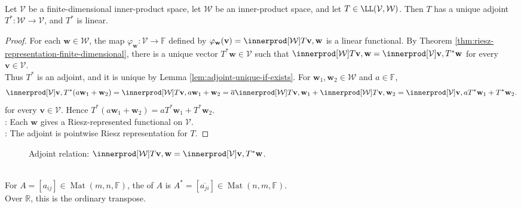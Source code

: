 \begin{theorem} \label{thm:finite-dimensional-adjoint-exists} \\
Let $\mathcal{V}$ be a finite-dimensional inner-product space, let $\mathcal{W}$ be an inner-product space, and let $T\in\LL(\mathcal{V},\mathcal{W})$. Then $T$ has a unique adjoint $T^*:\mathcal{W}\to\mathcal{V}$, and $T^*$ is linear.
\begin{proof}
For each $\mathbf{w}\in\mathcal{W}$, the map $\varphi_{\mathbf{w}}:\mathcal{V}\to\mathbb{F}$ defined by $\varphi_{\mathbf{w}}(\mathbf{v})=\innerprod[\mathcal{W}]{T\mathbf{v},\mathbf{w}}$ is a linear functional. By Theorem \ref{thm:riesz-representation-finite-dimensional}, there is a unique vector $T^*\mathbf{w}\in\mathcal{V}$ such that $\innerprod[\mathcal{W}]{T\mathbf{v},\mathbf{w}} =\innerprod[\mathcal{V}]{\mathbf{v},T^*\mathbf{w}}$ for every $\mathbf{v}\in\mathcal{V}$.\\
Thus $T^*$ is an adjoint, and it is unique by Lemma \ref{lem:adjoint-unique-if-exists}. For $\mathbf{w}_1,\mathbf{w}_2\in\mathcal{W}$ and $a\in\mathbb{F}$,
\begin{align}
\innerprod[\mathcal{V}]{\mathbf{v},T^*(a\mathbf{w}_1+\mathbf{w}_2)}
=\innerprod[\mathcal{W}]{T\mathbf{v},a\mathbf{w}_1+\mathbf{w}_2}
=\overline{a}\innerprod[\mathcal{W}]{T\mathbf{v},\mathbf{w}_1}+\innerprod[\mathcal{W}]{T\mathbf{v},\mathbf{w}_2}
=\innerprod[\mathcal{V}]{\mathbf{v},aT^*\mathbf{w}_1+T^*\mathbf{w}_2}. \nonumber
\end{align}
for every $\mathbf{v}\in\mathcal{V}$. Hence $T^*(a\mathbf{w}_1+\mathbf{w}_2)=aT^*\mathbf{w}_1+T^*\mathbf{w}_2$.\\
: Each $\mathbf{w}$ gives a Riesz-represented functional on $\mathcal{V}$.\\
: The adjoint is pointwise Riesz representation for $T$.
\end{proof}
\end{theorem}

\begin{figure}[H]
  \centering
  
  \caption{Adjoint relation: $\innerprod[\mathcal{W}]{T\mathbf{v},\mathbf{w}}=\innerprod[\mathcal{V}]{\mathbf{v},T^*\mathbf{w}}$.}
  \label{fig:adjoint-inner-product-bridge}
\end{figure}

\begin{definition} \label{def:conjugate-transpose} \\
For $A=[a_{ij}]\in\operatorname{Mat}(m,n,\mathbb{F})$, the  of $A$ is $A^*=[\overline{a_{ji}}]\in\operatorname{Mat}(n,m,\mathbb{F})$.\\
Over $\mathbb{R}$, this is the ordinary transpose.
\end{definition}

